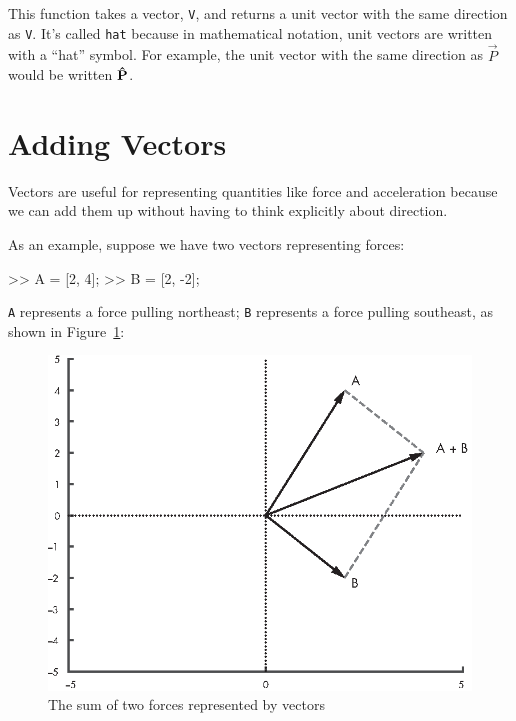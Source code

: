 This function takes a vector, \lstinline{V}, and returns a unit vector with the same direction as \lstinline{V}.  It's called \lstinline{hat} because in mathematical notation, unit vectors are written with a ``hat'' symbol.  
For example, the unit vector with the same direction as $\vec{P}$ would be written $\uvec{P}$. 


\section{Adding Vectors}

Vectors are useful for representing quantities like force and acceleration because we can add them up without having to think explicitly about direction.


As an example, suppose we have two vectors representing forces:

\begin{code}
>> A = [2, 4];
>> B = [2, -2];
\end{code}

\lstinline{A} represents a force pulling northeast; \lstinline{B} represents a force pulling southeast, as shown in Figure~\ref{fig:vector2}:

\begin{figure}[h]
\includegraphics{images/figure12_01_new.eps}
\caption{The sum of two forces represented by vectors}
\label{fig:vector2}
\end{figure}

